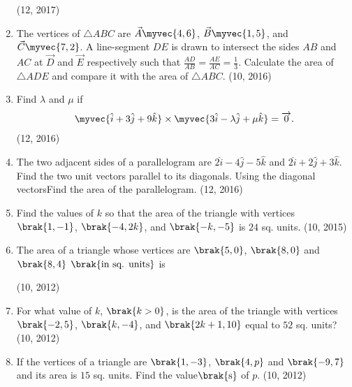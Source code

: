 \begin{enumerate}[label=\thesubsection.\arabic*, ref=\thesubsection.\theenumi]
	    \hfill (12,  2017)
    \item The vertices of $\triangle ABC$ are $\vec{A} \myvec{4,  6}$,  $\vec{B} \myvec{1,  5}$,  and $\vec{C} \myvec{7,  2}$. A line-segment $DE$ is drawn to intersect the sides $AB$ and $AC$ at $\vec{D}$ and $\vec{E}$ respectively such that $\frac{AD}{AB} = \frac{AE}{AC} = \frac{1}{3}$. Calculate the area of $\triangle ADE$ and compare it with the area of $\triangle ABC$. \hfill (10,  2016)
\item Find $\lambda$ and $\mu$ if
      \begin{align*}
          \myvec{\hat{i} + 3\hat{j} + 9\hat{k}} \times \myvec{3\hat{i} - \lambda \hat{j} + \mu \hat{k}} = \overrightarrow{0}.
      \end{align*}
      \hfill (12,  2016)
\item The two adjacent sides of a parallelogram are $2\hat{i}-4\hat{j}-5\hat{k}$ and $2\hat{i}+2\hat{j}+3\hat{k}$. Find the two unit vectors parallel to its diagonals. Using the diagonal vectorsFind the area of the parallelogram. \hfill (12,  2016)
\item Find the values of $k$ so that the area of the triangle with vertices $\brak{1,  -1}$,  $\brak{-4,  2k}$,  and $\brak{-k,  -5}$ is $24$ sq. units. \hfill (10,  2015)
\item The area of a triangle whose vertices are $\brak{5, 0}$,  $\brak{8, 0}$ and $\brak{8, 4}$ $\brak{\text{in sq. units}}$ is

\hfill (10,  2012)
\item For what value of $k$,  $\brak{ k > 0}$,  is the area of the triangle with vertices $\brak{-2, 5}$,  $\brak{k, -4}$,  and $\brak{2k+1, 10}$ equal to $52$ sq. units? 
\hfill (10,  2012)

\item If the vertices of a triangle are $\brak{1, -3}$,  $\brak{4, p}$ and $\brak{-9, 7}$ and its area is $15$ sq. units. Find the value$\brak{\text{s}}$ of $p$. 
\hfill (10,  2012)


\end{enumerate}
